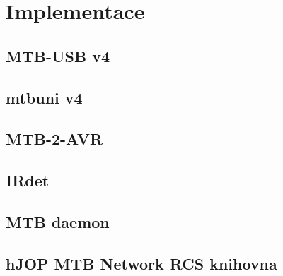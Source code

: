 \section{Implementace}

\subsection{MTB-USB v4}


\subsection{\gls{mtbuni} v4}


\subsection{MTB-2-AVR}


\subsection{IRdet}


\subsection{MTB daemon}


\subsection{hJOP MTB Network RCS knihovna}
